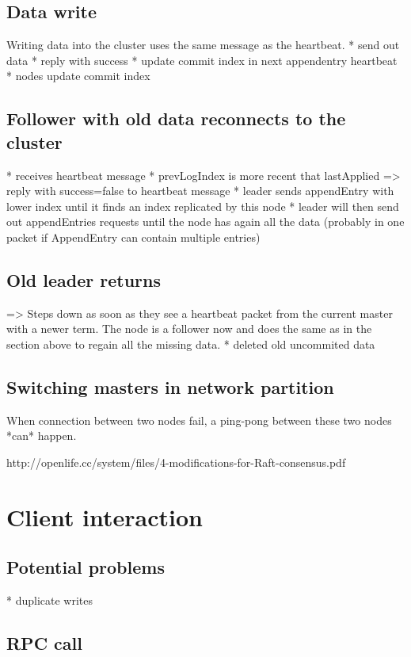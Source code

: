 \subsection{Data write}
Writing data into the cluster uses the same message as the heartbeat.
* send out data
* reply with success
* update commit index in next appendentry heartbeat
* nodes update commit index

\subsection{Follower with old data reconnects to the cluster}
* receives heartbeat message
* prevLogIndex is more recent that lastApplied => reply with success=false to heartbeat message
* leader sends appendEntry with lower index until it finds an index replicated by this node
* leader will then send out appendEntries requests until the node has again all the data (probably in one packet if AppendEntry can contain multiple entries)

\subsection{Old leader returns}
=> Steps down as soon as they see a heartbeat packet from the current master with a newer term.
The node is a follower now and does the same as in the section above to regain all the missing data.
* deleted old uncommited data

\subsection{Switching masters in network partition}
When connection between two nodes fail, a ping-pong between these two nodes *can* happen.

http://openlife.cc/system/files/4-modifications-for-Raft-consensus.pdf

\section{Client interaction}

\subsection{Potential problems}
* duplicate writes

\subsection{RPC call}
